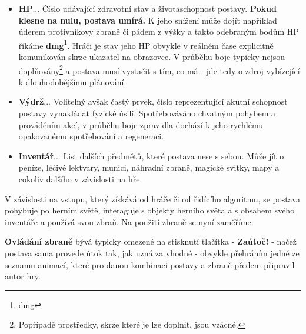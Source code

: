 \begin{itemize}
    \item \textbf{\ac{HP}}... Číslo udávající zdravotní stav a životaschopnost postavy. \textbf{Pokud klesne na nulu, postava umírá.} K jeho snížení může dojít například úderem protivníkovy zbraně či pádem z výšky a takto odebraným bodům HP říkáme \textbf{\acs{dmg}}\footnote{\Acl{dmg}}. Hráči je stav jeho HP obvykle v reálném čase explicitně komunikován skrze ukazatel na obrazovce. V průběhu boje typicky nejsou doplňovány\footnote{Popřípadě prostředky, skrze které je lze doplnit, jsou vzácné.} a postava musí vystačit s tím, co má - jde tedy o zdroj vybízející k dlouhodobějšímu plánování.
    \item \textbf{Výdrž}... Volitelný avšak častý prvek, číslo reprezentující akutní schopnost postavy vynakládat fyzické úsilí. Spotřebováváno chvatným pohybem a prováděním akcí, v průběhu boje zpravidla dochází k jeho rychlému opakovanému spotřebování a regeneraci.
    \item \textbf{Inventář}... List dalších předmětů, které postava nese s sebou. Může jít o peníze, léčivé lektvary, munici, náhradní zbraně, magické svitky, mapy a cokoliv dalšího v závislosti na hře. 
\end{itemize}

V závislosti na vstupu, který získává od hráče či od řidícího algoritmu, se postava pohybuje po herním světě, interaguje s objekty herního světa a s obsahem svého inventáře a používá svou zbraň. Na použití zbraně se nyní zaměříme.

\textbf{Ovládání zbraně} bývá typicky omezené na stisknutí tlačítka - \textbf{Zaútoč!} - načež postava sama provede útok tak, jak uzná za vhodné - obvykle přehráním jedné ze seznamu animací, které pro danou kombinaci postavy a zbraně předem připravil autor hry.

